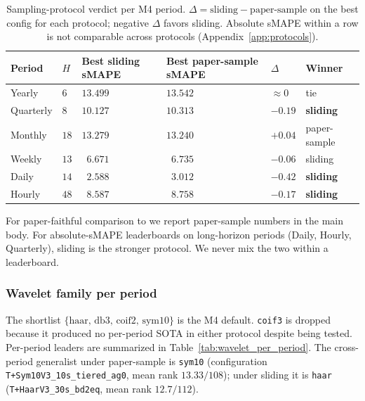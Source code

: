 \documentclass[11pt,a4paper]{article}
\begin{document}
\begin{table}[h]
\centering
\small
\caption{Sampling-protocol verdict per M4 period. $\Delta = \text{sliding} - \text{paper-sample}$ on the best config for each protocol; negative $\Delta$ favors sliding. Absolute sMAPE within a row is not comparable across protocols (Appendix~\ref{app:protocols}).}
\label{tab:protocol_per_period}
\begin{tabular}{@{}llllll@{}}
\toprule
Period & $H$ & Best sliding sMAPE & Best paper-sample sMAPE & $\Delta$ & Winner \\
\midrule
Yearly    & $6$  & $13.499$ & $13.542$ & $\approx 0$ & tie \\
Quarterly & $8$  & $10.127$ & $10.313$ & $-0.19$ & \textbf{sliding} \\
Monthly   & $18$ & $13.279$ & $13.240$ & $+0.04$ & paper-sample \\
Weekly    & $13$ & $\phantom{0}6.671$ & $\phantom{0}6.735$ & $-0.06$ & sliding \\
Daily     & $14$ & $\phantom{0}2.588$ & $\phantom{0}3.012$ & $\mathbf{-0.42}$ & \textbf{sliding} \\
Hourly    & $48$ & $\phantom{0}8.587$ & $\phantom{0}8.758$ & $-0.17$ & \textbf{sliding} \\
\bottomrule
\end{tabular}
\end{table}

For paper-faithful comparison to \citet{oreshkin2020nbeats} we report paper-sample numbers in the main body. For absolute-sMAPE leaderboards on long-horizon periods (Daily, Hourly, Quarterly), sliding is the stronger protocol. We never mix the two within a leaderboard.

\subsubsection{Wavelet family per period}
\label{app:hyperparams:wavelet}

The shortlist $\{\text{haar},\,\text{db3},\,\text{coif2},\,\text{sym10}\}$ is the M4 default. \texttt{coif3} is dropped because it produced no per-period SOTA in either protocol despite being tested. Per-period leaders are summarized in Table~\ref{tab:wavelet_per_period}. The cross-period generalist under paper-sample is \texttt{sym10} (configuration \texttt{T+Sym10V3\_10s\_tiered\_ag0}, mean rank $13.33/108$); under sliding it is \texttt{haar} (\texttt{T+HaarV3\_30s\_bd2eq}, mean rank $12.7/112$).
\end{document}
